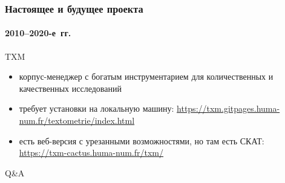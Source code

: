 \begin{frame}
  \frametitle{Настоящее и будущее проекта}
  \framesubtitle{2010--2020-е~гг.}

  \begin{block}{TXM}
    \begin{itemize}
      \item корпус-менеджер с богатым инструментарием для количественных и качественных исследований
      \item требует установки на локальную машину: \url{https://txm.gitpages.huma-num.fr/textometrie/index.html}
      \item есть веб-версия с урезанными возможностями, но там есть СКАТ: \url{https://txm-cactus.huma-num.fr/txm/}
    \end{itemize}
  \end{block}
\end{frame}

\begin{frame}{}
  \centering
  \vfill
  \Huge
  Q\&A
  \vfill
\end{frame}
